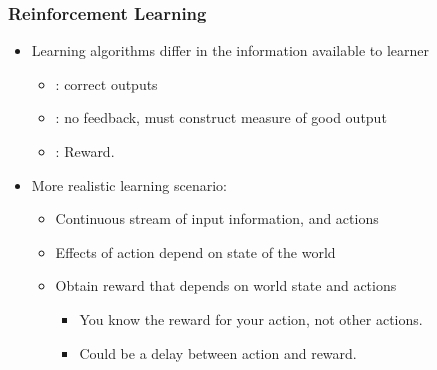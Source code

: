 \documentclass[handout]{beamer}
\begin{document}
% 

\begin{frame}\frametitle{Reinforcement Learning}\small
\begin{itemize}
\item Learning algorithms differ in the information available to learner
\begin{itemize}
\item {}: correct outputs
\item {}: no feedback, must construct measure of good output
\item {}: Reward.
\end{itemize}
\item More realistic learning scenario: 
\begin{itemize}
\item Continuous stream of input information, and actions\\[0.7mm] 
\item Effects of action depend on state of the world\\[0.7mm] 
\item Obtain reward that depends on world state and actions\\[0.7mm] 
\begin{itemize}
\item You know the reward for your action, not other actions.
\item Could be a delay between action and reward.
\end{itemize}
\end{itemize}
\end{itemize}
\end{frame}
\end{document}
